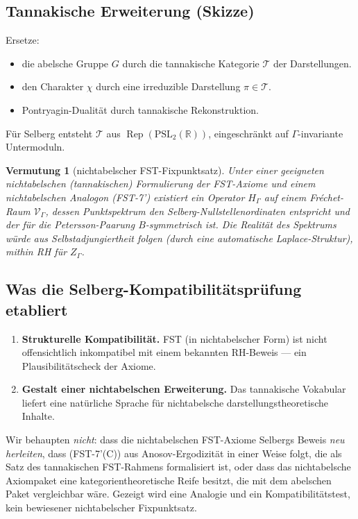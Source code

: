 \documentclass[11pt,a4paper]{article}
\theoremstyle{plain}
\newtheorem{conjecture}[theorem]{Vermutung}
\theoremstyle{definition}
\DeclareMathOperator{\Rep}{Rep}
\newcommand{\R}{\mathbb{R}}
\newcommand{\V}{\mathcal{V}}
\newcommand{\T}{\mathcal{T}}
\newcommand{\chifn}{\chi}
\begin{document}
\subsection{Tannakische Erweiterung (Skizze)}

Ersetze:
\begin{itemize}
\item die abelsche Gruppe $G$ durch die tannakische Kategorie $\T$ der
  Darstellungen.
\item den Charakter $\chifn$ durch eine irreduzible Darstellung
  $\pi \in \T$.
\item Pontryagin-Dualität durch tannakische Rekonstruktion.
\end{itemize}

Für Selberg entsteht $\T$ aus $\Rep(\mathrm{PSL}_2(\R))$, eingeschränkt
auf $\Gamma$-invariante Untermoduln.

\begin{conjecture}[nichtabelscher FST-Fixpunktsatz]
\label{conj:nonabelian-fixed-point}
Unter einer geeigneten nichtabelschen (tannakischen) Formulierung der
FST-Axiome und einem nichtabelschen Analogon (FST-7') existiert ein
Operator $H_\Gamma$ auf einem Fréchet-Raum $\V_\Gamma$, dessen
Punktspektrum den Selberg-Nullstellenordinaten entspricht und der für die
Petersson-Paarung $B$-symmetrisch ist. Die Realität des Spektrums würde aus
Selbstadjungiertheit folgen (durch eine automatische Laplace-Struktur),
mithin RH für $Z_\Gamma$.
\end{conjecture}

\subsection{Was die Selberg-Kompatibilitätsprüfung etabliert}

\begin{enumerate}[leftmargin=*]
\item \textbf{Strukturelle Kompatibilität.} FST (in nichtabelscher Form)
  ist nicht offensichtlich inkompatibel mit einem bekannten RH-Beweis ---
  ein Plausibilitätscheck der Axiome.
\item \textbf{Gestalt einer nichtabelschen Erweiterung.} Das tannakische
  Vokabular liefert eine natürliche Sprache für nichtabelsche
  darstellungstheoretische Inhalte.
\end{enumerate}

Wir behaupten \emph{nicht}: dass die nichtabelschen FST-Axiome Selbergs
Beweis \emph{neu herleiten}, dass (FST-7'(C)) aus Anosov-Ergodizität in
einer Weise folgt, die als Satz des tannakischen FST-Rahmens formalisiert
ist, oder dass das nichtabelsche Axiompaket eine kategorientheoretische
Reife besitzt, die mit dem abelschen Paket vergleichbar wäre. Gezeigt wird
eine Analogie und ein Kompatibilitätstest, kein bewiesener nichtabelscher
Fixpunktsatz.
\end{document}
